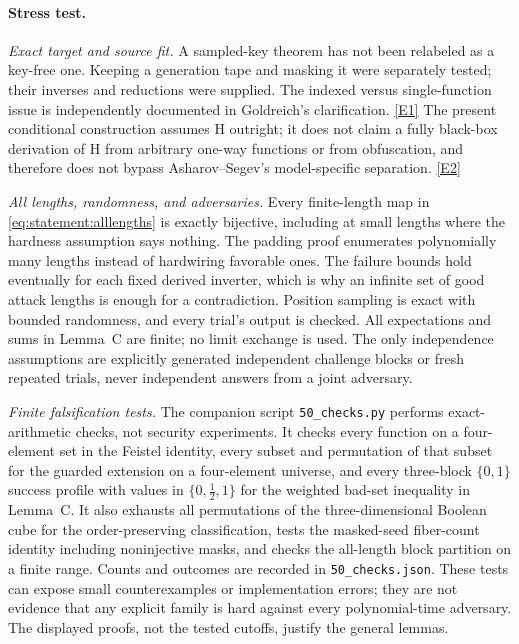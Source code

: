 \documentclass[11pt,a4paper]{article}
\newcommand{\eref}[2]{\hyperlink{extra:#1:#2}{[E#2]}}
\numberwithin{equation}{section}
\begin{document}
\paragraph{Stress test.}
\textit{Exact target and source fit.}
A sampled-key theorem has not been relabeled as a key-free one. Keeping
a generation tape and masking it were separately tested; their inverses
and reductions were supplied. The indexed versus single-function issue
is independently documented in Goldreich's clarification.
\eref{statement}{1} The present conditional construction assumes H outright;
it does not claim a fully black-box derivation of H from arbitrary
one-way functions or from obfuscation, and therefore does not bypass
Asharov--Segev's model-specific separation. \eref{statement}{2}

\textit{All lengths, randomness, and adversaries.}
Every finite-length map in \eqref{eq:statement:alllengths} is exactly bijective,
including at small lengths where the hardness assumption says nothing.
The padding proof enumerates polynomially many lengths instead of
hardwiring favorable ones. The failure bounds hold eventually for each
fixed derived inverter, which is why an infinite set of good attack
lengths is enough for a contradiction. Position sampling is exact with
bounded randomness, and every trial's output is checked. All
expectations and sums in Lemma~C are finite; no limit exchange is used.
The only independence assumptions are explicitly generated independent
challenge blocks or fresh repeated trials, never independent answers
from a joint adversary.

\textit{Finite falsification tests.}
The companion script \texttt{50\_checks.py} performs exact-arithmetic
checks, not security experiments. It checks every function on a
four-element set in the Feistel identity, every subset and permutation
of that subset for the guarded extension on a four-element universe,
and every three-block $\{0,1\}$ success profile with values in
$\{0,\tfrac12,1\}$ for the weighted bad-set inequality in Lemma~C.
It also exhausts all permutations of the three-dimensional Boolean
cube for the order-preserving classification, tests the masked-seed
fiber-count identity including noninjective masks, and checks the
all-length block partition on a finite range. Counts and outcomes are
recorded in \texttt{50\_checks.json}. These tests can expose small
counterexamples or implementation errors; they are not evidence that
any explicit family is hard against every polynomial-time adversary.
The displayed proofs, not the tested cutoffs, justify the general
lemmas.
\end{document}
